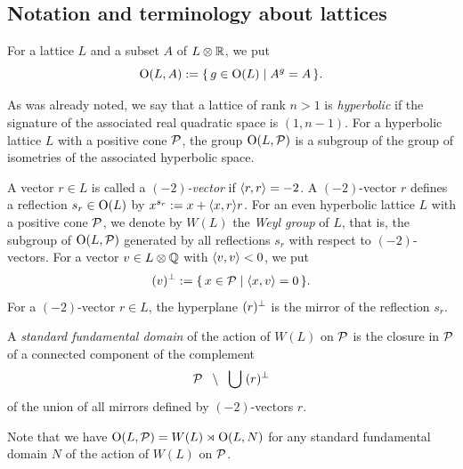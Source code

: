 \documentclass{amsart} %
\begin{document}
\subsection{Notation and terminology about lattices}\label{subsec:notationlat}
%
For a lattice $L$ and a subset $A$ of $L\otimes \mathord{\mathbb{R}}$,
we put
\[
\mathord{\mathrm{O}}(L, A):=\{\,{g\in \mathord{\mathrm{O}}(L)}\mid {A^g=A} \,\}.
\]
\par
As was already noted,
we say that a lattice of rank $n>1$ is \emph{hyperbolic}
if the signature of the associated real quadratic space is $(1, n-1)$.
For a hyperbolic lattice $L$ with a positive cone $\mathord{\mathcal{P}}$,
the group
$\mathord{\mathrm{O}}(L, \mathord{\mathcal{P}})$ is a subgroup of the group of isometries of the associated hyperbolic space.
\par %
A vector $r\in L$ is called a \emph{$(-2)$-vector} if $\langle r, r \rangle=-2$.
A $(-2)$-vector $r$ defines a reflection 
$s_r\in \mathord{\mathrm{O}}(L)$ by $x^{s_r}:=x+\langle x, r \rangle r$.
For an even hyperbolic lattice $L$ with a positive cone $\mathord{\mathcal{P}}$,
we denote by $W(L)$ the \emph{Weyl group} of $L$,
that is, the subgroup of $\mathord{\mathrm{O}}(L, \mathord{\mathcal{P}})$
generated by all reflections $s_r$ with respect to $(-2)$-vectors.
For a vector $v \in L\otimes\mathord{\mathbb{Q}}$ with $\langle v, v \rangle<0$,
we put 
\[
(v)^{\perp}:=\{\,{x\in \mathord{\mathcal{P}}}\mid {\langle x, v \rangle=0} \,\}.
\]
For a $(-2)$-vector $r\in L$, 
the hyperplane $(r)^{\perp}$ is the mirror of the 
reflection $s_r$.
%
\begin{definition}
A \emph{standard fundamental domain} of the action of $W(L)$ on $\mathord{\mathcal{P}}$
is the closure in $ \mathord{\mathcal{P}}$ of a connected component of the complement 
\[
\mathord{\mathcal{P}}\;\;\setminus \;\;\bigcup\; (r)^{\perp}
\]
of the union of all mirrors defined by $(-2)$-vectors $r$.
\end{definition}
%
Note that we have $\mathord{\mathrm{O}}(L, \mathord{\mathcal{P}})=W(L)\rtimes \mathord{\mathrm{O}}(L, N)$
for any standard fundamental domain $N$ of the action of $W(L)$ on $\mathord{\mathcal{P}}$.
%
\end{document}
